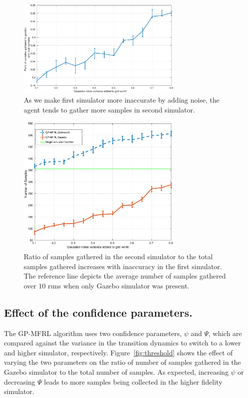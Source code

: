\documentclass[12pt]{report}
\begin{document}
\begin{figure}[htp]
	\centering
	\includegraphics[width=8cm]{ratio.eps}
	\caption{As we make first simulator more inaccurate by adding noise, the agent tends to gather more samples in second simulator. }
   \label{fig:gp_mfrl_samples}
\end{figure}

\begin{figure}[htp]
	\centering
	\includegraphics[width=8cm]{samples_gathered_.eps}
	\caption{Ratio of samples gathered in the second simulator to the total samples gathered increases with inaccuracy in the first simulator. The reference line depicts the average number of samples gathered over $10$ runs when only Gazebo simulator was present.}
   \label{fig:gp_mfrl_ratio}
\end{figure}

\subsection{Effect of the confidence parameters.}
The GP-MFRL algorithm uses two confidence parameters, $\psi$ and $\Psi$, which are compared against the variance in the transition dynamics to switch to a lower and higher simulator, respectively. Figure~\ref{fig:threshold} shows the effect of varying the two parameters on the ratio of number of samples gathered in the Gazebo simulator to the total number of samples. As expected, increasing $\psi$ or decreasing $\Psi$ leads to more samples being collected in the higher fidelity simulator. 
\end{document}

